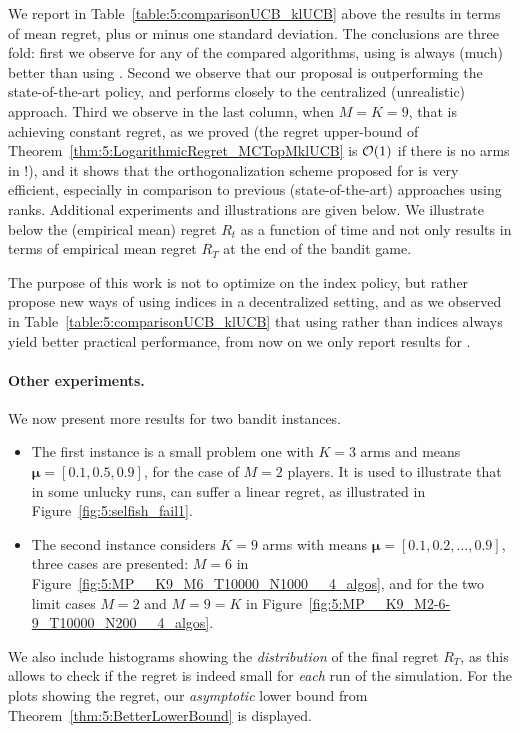 We report in Table~\ref{table:5:comparisonUCB_klUCB} above the results in terms of mean regret, plus or minus one standard deviation.
The conclusions are three fold: first we observe for any of the compared algorithms, using \klUCB{} is always (much) better than using \UCB.
Second we observe that our proposal \MCTopM{} is outperforming the state-of-the-art \RhoRand{} policy, and performs closely to the centralized (unrealistic) approach.
Third we observe in the last column, when $M=K=9$, that \MCTopM{} is achieving constant regret, as we proved (the regret upper-bound of Theorem~\ref{thm:5:LogarithmicRegret_MCTopMklUCB} is $\mathcal{O}(1)$ if there is no arms in \Mworst{} !), and it shows that the orthogonalization scheme proposed for \MCTopM{} is very efficient, especially in comparison to previous (state-of-the-art) approaches using ranks.
%
Additional experiments and illustrations are given below.
We illustrate below the (empirical mean) regret $R_t$ as a function of time and not only results in terms of empirical mean regret $R_T$ at the end of the bandit game.


The purpose of this work is not to optimize on the index policy, but rather propose new ways of using indices in a decentralized setting,
and as we observed in Table~\ref{table:5:comparisonUCB_klUCB} that using \klUCB{} rather than \UCB{} indices always yield better practical performance,
from now on we only report results for \klUCB.


\paragraph{Other experiments.}
%
We now present more results for two bandit instances.
\begin{itemize}
  \item
  The first instance is a small problem one with $K=3$ arms and means
  $\boldsymbol{\mu} = [0.1, 0.5, 0.9]$, for the case of $M=2$ players.
  It is used to illustrate that in some unlucky runs, \Selfish{} can suffer a linear regret, as illustrated in Figure~\ref{fig:5:selfish_fail1}.
  \item
  The second instance considers $K=9$ arms with means $\boldsymbol{\mu} = [0.1, 0.2, \dots, 0.9]$,
  three cases are presented: $M=6$ in Figure~\ref{fig:5:MP__K9_M6_T10000_N1000__4_algos},
  and for the two limit cases $M=2$ and $M=9=K$ in Figure~\ref{fig:5:MP__K9_M2-6-9_T10000_N200__4_algos}.
\end{itemize}
%
We also include histograms showing the \emph{distribution} of the final regret $R_T$,
as this allows to check if the regret is indeed small for \emph{each} run of the simulation.
%
For the plots showing the regret, our \emph{asymptotic} lower bound from Theorem~\ref{thm:5:BetterLowerBound} is displayed.


